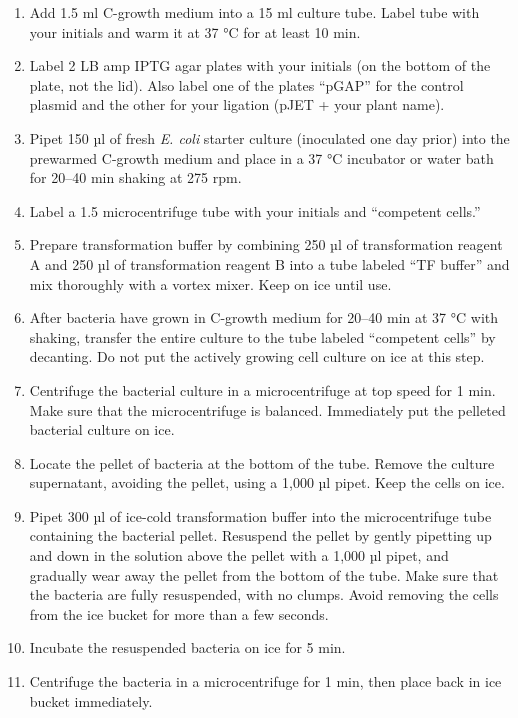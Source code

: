 \documentclass[]{book}
\providecommand{\tightlist}{%
  \setlength{\itemsep}{0pt}\setlength{\parskip}{0pt}}
\begin{document}
\begin{enumerate}
\def\labelenumi{\arabic{enumi}.}
\tightlist
\item
  Add 1.5 ml C-growth medium into a 15 ml culture tube. Label tube with your initials and warm it at 37 °C for at least 10 min.
\item
  Label 2 LB amp IPTG agar plates with your initials (on the bottom of the plate, not the lid). Also label one of the plates ``pGAP'' for the control plasmid and the other for your ligation (pJET + your plant name).
\item
  Pipet 150 µl of fresh \emph{E. coli} starter culture (inoculated one day prior) into the prewarmed C-growth medium and place in a 37 °C incubator or water bath for 20--40 min shaking at 275 rpm.
\item
  Label a 1.5 microcentrifuge tube with your initials and ``competent cells.''
\item
  Prepare transformation buffer by combining 250 µl of transformation reagent A and 250 µl of transformation reagent B into a tube labeled ``TF buffer'' and mix thoroughly with a vortex mixer. Keep on ice until use.
\item
  After bacteria have grown in C-growth medium for 20--40 min at 37 °C with shaking, transfer the entire culture to the tube labeled ``competent cells'' by decanting. Do not put the actively growing cell culture on ice at this step.
\item
  Centrifuge the bacterial culture in a microcentrifuge at top speed for 1 min. Make sure that the microcentrifuge is balanced. Immediately put the pelleted bacterial culture on ice.
\item
  Locate the pellet of bacteria at the bottom of the tube. Remove the culture supernatant, avoiding the pellet, using a 1,000 µl pipet. Keep the cells on ice.
\item
  Pipet 300 µl of ice-cold transformation buffer into the microcentrifuge tube containing the bacterial pellet. Resuspend the pellet by gently pipetting up and down in the solution above the pellet with a 1,000 µl pipet, and gradually wear away the pellet from the bottom of the tube. Make sure that the bacteria are fully resuspended, with no clumps. Avoid removing the cells from the ice bucket for more than a few seconds.
\item
  Incubate the resuspended bacteria on ice for 5 min.
\item
  Centrifuge the bacteria in a microcentrifuge for 1 min, then place back in ice bucket immediately.
\end{enumerate}
\end{document}
